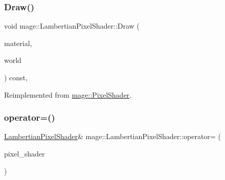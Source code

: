 \subsubsection{\texorpdfstring{Draw()}{Draw()}}
{\footnotesize\ttfamily void mage\+::\+Lambertian\+Pixel\+Shader\+::\+Draw (\begin{DoxyParamCaption}\item[{const \hyperlink{structmage_1_1_material}{Material} \&}]{material,  }\item[{const \hyperlink{classmage_1_1_world}{World} \&}]{world }\end{DoxyParamCaption}) const\hspace{0.3cm}{\ttfamily [override]}, {\ttfamily [virtual]}}



Reimplemented from \hyperlink{classmage_1_1_pixel_shader_ac0506a453bf814b32aeb00819ec05806}{mage\+::\+Pixel\+Shader}.

\hypertarget{classmage_1_1_lambertian_pixel_shader_a03ae64ef13e62b33c6b6ac306207a045}{}\label{classmage_1_1_lambertian_pixel_shader_a03ae64ef13e62b33c6b6ac306207a045} 
\subsubsection{\texorpdfstring{operator=()}{operator=()}\hspace{0.1cm}{\footnotesize\ttfamily [1/2]}}
{\footnotesize\ttfamily \hyperlink{classmage_1_1_lambertian_pixel_shader}{Lambertian\+Pixel\+Shader}\& mage\+::\+Lambertian\+Pixel\+Shader\+::operator= (\begin{DoxyParamCaption}\item[{const \hyperlink{classmage_1_1_lambertian_pixel_shader}{Lambertian\+Pixel\+Shader} \&}]{pixel\+\_\+shader }\end{DoxyParamCaption})\hspace{0.3cm}{\ttfamily [delete]}}

\hypertarget{classmage_1_1_lambertian_pixel_shader_af3fd77b32ff54a932b9c8734446cd5bd}{}\label{classmage_1_1_lambertian_pixel_shader_af3fd77b32ff54a932b9c8734446cd5bd} 
